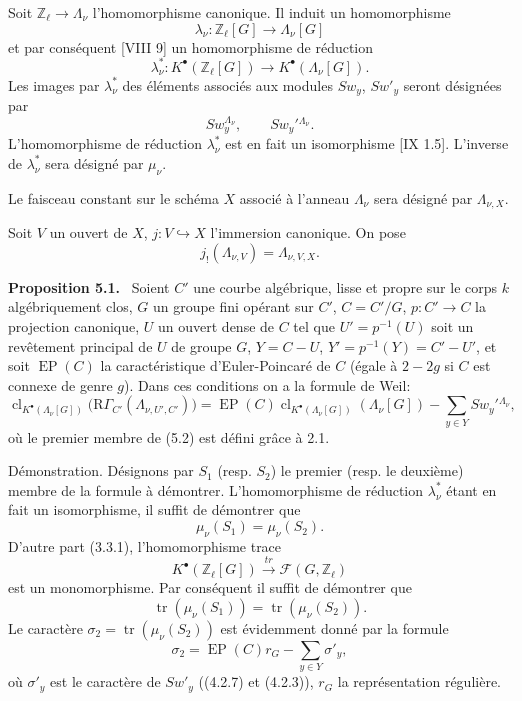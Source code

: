 \documentclass[11pt]{article}
\newenvironment{statement}[1]{\par\medskip\noindent\textbf{#1.}\ }{\par\medskip}
\providecommand{\EP}{\operatorname{EP}}
\providecommand{\EP}{\operatorname{EP}}
\providecommand{\clKstar}[1]{\operatorname{cl}_{K^{\bullet}(#1)}}
\providecommand{\RG}{\mathrm R\Gamma}
\begin{document}
Soit $\mathbb Z_\ell\to\Lambda_\nu$ l'homomorphisme canonique. Il induit un homomorphisme
\[
\lambda_\nu:\mathbb Z_\ell[G]\longrightarrow \Lambda_\nu[G]
\]
et par conséquent [VIII 9] un homomorphisme de réduction
\[
\lambda_\nu^*:K^{\bullet}(\mathbb Z_\ell[G])\longrightarrow K^{\bullet}(\Lambda_\nu[G]).
\]
Les images par $\lambda_\nu^*$ des éléments associés aux modules $Sw_y$, $Sw'_y$ seront désignées par
\[
Sw_y^{\Lambda_\nu},\qquad Sw_y'{}^{\Lambda_\nu}.
\]
L'homomorphisme de réduction $\lambda_\nu^*$ est en fait un isomorphisme [IX 1.5]. L'inverse de $\lambda_\nu^*$ sera désigné par $\mu_\nu$.

Le faisceau constant sur le schéma $X$ associé à l'anneau $\Lambda_\nu$ sera désigné par $\Lambda_{\nu,X}$.

Soit $V$ un ouvert de $X$, $j:V\hookrightarrow X$ l'immersion canonique. On pose
\[
j_!(\Lambda_{\nu,V})=\Lambda_{\nu,V,X}.
\]

\begin{statement}{Proposition 5.1}
Soient $C'$ une courbe algébrique, lisse et propre sur le corps $k$ algébriquement clos, $G$ un groupe fini opérant sur $C'$, $C=C'/G$, $p:C'\to C$ la projection canonique, $U$ un ouvert dense de $C$ tel que $U'=p^{-1}(U)$ soit un revêtement principal de $U$ de groupe $G$, $Y=C-U$, $Y'=p^{-1}(Y)=C'-U'$, et soit $\EP(C)$ la caractéristique d'Euler-Poincaré de $C$ (égale à $2-2g$ si $C$ est connexe de genre $g$).
Dans ces conditions on a la formule de Weil:
\[
\clKstar{\Lambda_\nu[G]}\bigl(\RG_{C'}(\Lambda_{\nu,U',C'})\bigr)
=
\EP(C)\clKstar{\Lambda_\nu[G]}(\Lambda_\nu[G])
-\sum_{y\in Y}Sw_y'{}^{\Lambda_\nu},
\tag{5.2}
\]
où le premier membre de (5.2) est défini grâce à 2.1.
\end{statement}

Démonstration. Désignons par $S_1$ (resp. $S_2$) le premier (resp. le deuxième) membre de la formule à démontrer. L'homomorphisme de réduction $\lambda_\nu^*$ étant en fait un isomorphisme, il suffit de démontrer que
\[
\mu_\nu(S_1)=\mu_\nu(S_2).
\]
D'autre part (3.3.1), l'homomorphisme trace
\[
K^{\bullet}(\mathbb Z_\ell[G])\xrightarrow{\ tr\ }\mathcal F(G,\mathbb Z_\ell)
\]
est un monomorphisme. Par conséquent il suffit de démontrer que
\[
\operatorname{tr}(\mu_\nu(S_1))=\operatorname{tr}(\mu_\nu(S_2)).
\]
Le caractère $\sigma_2=\operatorname{tr}(\mu_\nu(S_2))$ est évidemment donné par la formule
\[
\sigma_2=\EP(C)r_G-\sum_{y\in Y}\sigma'_y,
\tag{5.2.1}
\]
où $\sigma'_y$ est le caractère de $Sw'_y$ ((4.2.7) et (4.2.3)), $r_G$ la représentation régulière.
\end{document}
